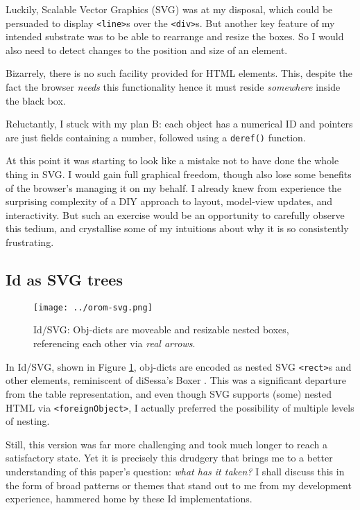 Luckily, Scalable Vector Graphics (SVG) was at my disposal, which could
be persuaded to display \texttt{\textless{}line\textgreater{}}s over the
\texttt{\textless{}div\textgreater{}}s. But another key feature of my
intended substrate was to be able to rearrange and resize the boxes. So
I would also need to detect changes to the position and size of an
element.

Bizarrely, there is no such facility provided for HTML elements. This,
despite the fact the browser \emph{needs} this functionality hence it
must reside \emph{somewhere} inside the black box.

Reluctantly, I stuck with my plan B: each object has a numerical ID and
pointers are just fields containing a number, followed using a
\texttt{deref()} function.

At this point it was starting to look like a mistake not to have done
the whole thing in SVG. I would gain full graphical freedom, though also
lose some benefits of the browser's managing it on my behalf. I already
knew from experience the surprising complexity of a DIY approach to
layout, model-view updates, and interactivity. But such an exercise
would be an opportunity to carefully observe this tedium, and
crystallise some of my intuitions about why it is so consistently
frustrating.

\hypertarget{as-svg-trees}{%
\subsection{\texorpdfstring{Id{} as SVG
trees}{ as SVG trees}}\label{as-svg-trees}}

\begin{figure}[h]
  \centering
  \texttt{[image: ../orom-svg.png]}
  \caption{Id{}/SVG: Obj-dicts are moveable and resizable nested boxes,
           referencing each other via \emph{real arrows}.\label{fig:orom-svg}}
\end{figure}

In Id{}/SVG, shown in Figure \ref{fig:orom-svg}, obj-dicts are encoded
as nested SVG \texttt{\textless{}rect\textgreater{}}s and other
elements, reminiscent of diSessa's Boxer \cite{boxer}. This was a
significant departure from the table representation, and even though SVG
supports (some) nested HTML via
\texttt{\textless{}foreignObject\textgreater{}}, I actually preferred
the possibility of multiple levels of nesting.

Still, this version was far more challenging and took much longer to
reach a satisfactory state. Yet it is precisely this drudgery that
brings me to a better understanding of this paper's question: \emph{what
has it taken?} I shall discuss this in the form of broad patterns or
themes that stand out to me from my development experience, hammered
home by these Id{} implementations.

